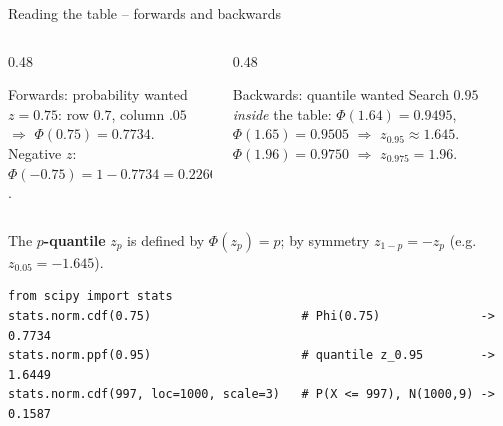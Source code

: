 \documentclass[aspectratio=169,11pt]{beamer}
\begin{document}
\begin{frame}[fragile]{Reading the table -- forwards and backwards}
  \lstset{aboveskip=2pt,belowskip=2pt}
  \begin{columns}[T]
    \begin{column}{0.48\textwidth}
      \begin{block}{Forwards: probability wanted}
        \small
        $z=0.75$: row $0.7$, column $.05$ $\Rightarrow$
        $\Phi(0.75)=\mathbf{0.7734}$.\\
        Negative $z$: $\Phi(-0.75)=1-0.7734=0.2266$.
      \end{block}
    \end{column}
    \begin{column}{0.48\textwidth}
      \begin{block}{Backwards: quantile wanted}
        \small
        Search $0.95$ \emph{inside} the table: $\Phi(1.64)=0.9495$,
        $\Phi(1.65)=0.9505$ $\Rightarrow$ $z_{0.95}\approx\mathbf{1.645}$.\\
        $\Phi(1.96)=0.9750$ $\Rightarrow$ $z_{0.975}=\mathbf{1.96}$.
      \end{block}
    \end{column}
  \end{columns}
  {\small The \textbf{$p$-quantile} $z_p$ is defined by $\Phi(z_p)=p$; by
  symmetry $z_{1-p}=-z_p$ (e.g.\ $z_{0.05}=-1.645$).}
\begin{lstlisting}
from scipy import stats
stats.norm.cdf(0.75)                     # Phi(0.75)              -> 0.7734
stats.norm.ppf(0.95)                     # quantile z_0.95        -> 1.6449
stats.norm.cdf(997, loc=1000, scale=3)   # P(X <= 997), N(1000,9) -> 0.1587
\end{lstlisting}
\end{frame}
\end{document}
